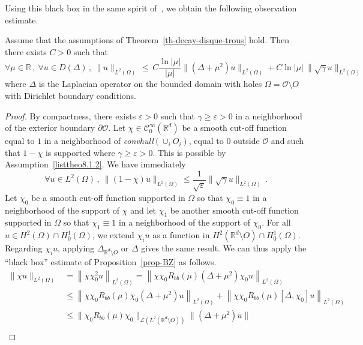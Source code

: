 \documentclass[AHL,Unicode,longabstracts]{cedram}
\newcommand{\RR}{\mathbb{R}}
\newcommand{\Cc}{\mathcal{C}}
\newcommand{\Lc}{\mathcal{L}}
\newcommand{\Oc}{\mathcal{O}}
\let\oldforall\forall
\renewcommand*{\forall}{\mathrel{\oldforall}}
\begin{document}
Using this black box in the same spirit of~\cite{Burq-Zworski}, we obtain the following observation estimate.

\begin{lemm}\label{lemma-BZ}
Assume that the assumptions of Theorem~\ref{th-decay-disque-trous} hold. Then there exists $C>0$ such that
\[
\forall \mu\in\RR\,,\:\forall u\in D(\Delta)\,,\:\|u\|_{L^2(\Omega)}\,\leq\,
C\frac {\ln |\mu|}{|\mu|} \|(\Delta+\mu^2)u\|_{L^2(\Omega)} + C{\ln |\mu|}\:
\|\sqrt{\gamma} u \|_{L^2(\Omega)}
\]
where $\Delta$ is the Laplacian operator on the bounded domain with holes $\Omega=\Oc\setminus O$ with Dirichlet boundary conditions.
\end{lemm}
\begin{proof}
By compactness, there exists $\varepsilon>0$ such that $\gamma\geq \varepsilon >0$ in a neighborhood of the exterior boundary $\partial \Oc$. Let $\chi\in\Cc^\infty_0(\RR^d)$ be a smooth cut-off function equal to $1$ in a neighborhood of \emph{convhull}$(\cup_i O_i)$, equal to $0$ outside $\Oc$ and such that $1-\chi$ is supported where $\gamma\geq \varepsilon >0$. This is possible by Assumption~\eqref{listtheo8.1.2}. We have immediately
\begin{equation}\label{eq-lemma-BZ-1}
\forall u\in L^2(\Omega)\,,\:\|(1-\chi) u\|_{L^2(\Omega)} \leq \frac 1{\sqrt{\varepsilon}} \|\sqrt{\gamma} u\|_{L^2(\Omega)}\,.
\end{equation}
Let $\chi_0$ be a smooth cut-off function supported in $\Omega$ so that $\chi_0\equiv 1$ in a neighborhood of the support of $\chi$ and let $\chi_1$ be another smooth cut-off function supported in $\Omega$ so that $\chi_1\equiv 1$ in a neighborhood of the support of $\chi_0$. For all $u\in H^2(\Omega)\cap H^1_0(\Omega)$, we extend $\chi_i u$ as a function in $H^2(\RR^d\setminus O)\cap H^1_0(\Omega)$. Regarding $\chi_i u$, applying $\Delta_{\RR^d\setminus O}$ or $\Delta$ gives the same result. We can thus apply the ``black box'' estimate of Proposition~\ref{prop-BZ} as follows.
\begin{align*}
\|\chi u\|_{L^2(\Omega)} & = \left\|\chi \chi_0^2 u\right\|_{L^2(\Omega)} = \left\|\chi\chi_0 R_{bb}(\mu)\left(\Delta+\mu^2\right)\chi_0 u\right\|_{L^2(\Omega)}\\
&\leq \left\|\chi\chi_0 R_{bb}(\mu)\chi_0\left(\Delta+\mu^2\right) u\right\|_{L^2(\Omega)} + \left\|\chi\chi_0 R_{bb}(\mu) [\Delta,\chi_0] u\right\|_{L^2(\Omega)}\\
&\leq \|\chi_0 R_{bb}(\mu)\chi_0\|_{\Lc\left(L^2(\RR^d\setminus O)\right)}
\|\left(\Delta+\mu^2\right)u\| \\

\end{align*}
\end{proof}
\end{document}
